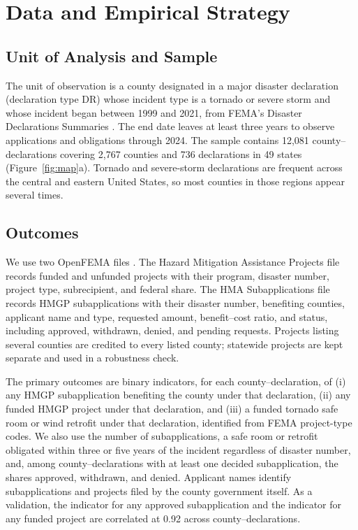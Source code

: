 \documentclass[12pt]{article}
\begin{document}
\section{Data and Empirical Strategy}

\subsection{Unit of Analysis and Sample}

The unit of observation is a county designated in a major disaster declaration (declaration type DR) whose incident type is a tornado or severe storm and whose incident began between 1999 and 2021, from FEMA's Disaster Declarations Summaries \parencite{openfema2026}. The end date leaves at least three years to observe applications and obligations through 2024. The sample contains 12,081 county--declarations covering 2,767 counties and 736 declarations in 49 states (Figure~\ref{fig:map}a). Tornado and severe-storm declarations are frequent across the central and eastern United States, so most counties in those regions appear several times.

\subsection{Outcomes}

We use two OpenFEMA files \parencite{openfema2026}. The Hazard Mitigation Assistance Projects file records funded and unfunded projects with their program, disaster number, project type, subrecipient, and federal share. The HMA Subapplications file records HMGP subapplications with their disaster number, benefiting counties, applicant name and type, requested amount, benefit--cost ratio, and status, including approved, withdrawn, denied, and pending requests. Projects listing several counties are credited to every listed county; statewide projects are kept separate and used in a robustness check.

The primary outcomes are binary indicators, for each county--declaration, of (i) any HMGP subapplication benefiting the county under that declaration, (ii) any funded HMGP project under that declaration, and (iii) a funded tornado safe room or wind retrofit under that declaration, identified from FEMA project-type codes. We also use the number of subapplications, a safe room or retrofit obligated within three or five years of the incident regardless of disaster number, and, among county--declarations with at least one decided subapplication, the shares approved, withdrawn, and denied. Applicant names identify subapplications and projects filed by the county government itself. As a validation, the indicator for any approved subapplication and the indicator for any funded project are correlated at 0.92 across county--declarations.
\end{document}
